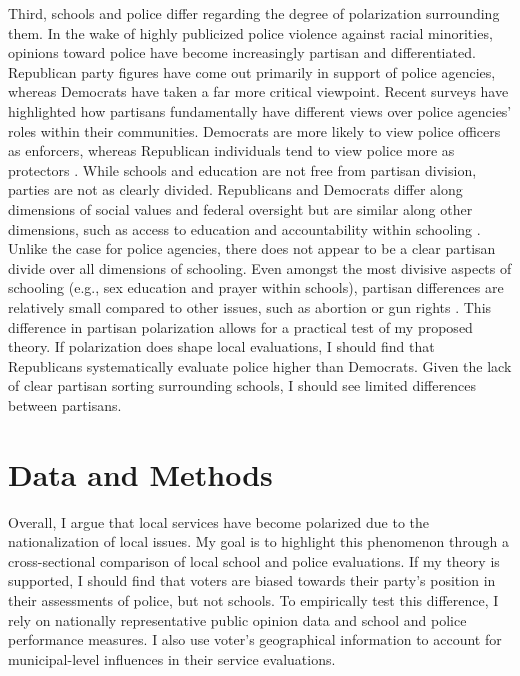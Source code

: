 Third, schools and police differ regarding the degree of polarization surrounding them. In the wake of highly publicized police violence against racial minorities, opinions toward police have become increasingly partisan and differentiated. Republican party figures have come out primarily in support of police agencies, whereas Democrats have taken a far more critical viewpoint. Recent surveys have highlighted how partisans fundamentally have different views over police agencies' roles within their communities. Democrats are more likely to view police officers as enforcers, whereas Republican individuals tend to view police more as protectors \citep{pewresearchcenterPartisansDifferWidley2017}. While schools and education are not free from partisan division, parties are not as clearly divided. Republicans and Democrats differ along dimensions of social values and federal oversight but are similar along other dimensions, such as access to education and accountability within schooling \citep{jensenCityLimitsPartisan2021}. Unlike the case for police agencies, there does not appear to be a clear partisan divide over all dimensions of schooling. Even amongst the most divisive aspects of schooling (e.g., sex education and prayer within schools), partisan differences are relatively small compared to other issues, such as abortion or gun rights \citep{shapiroAmericanPublicOpinion2021}. This difference in partisan polarization allows for a practical test of my proposed theory. If polarization does shape local evaluations, I should find that Republicans systematically evaluate police higher than Democrats. Given the lack of clear partisan sorting surrounding schools, I should see limited differences between partisans.


\section{Data and Methods}
Overall, I argue that local services have become polarized due to the nationalization of local issues. My goal is to highlight this phenomenon through a cross-sectional comparison of local school and police evaluations. If my theory is supported, I should find that voters are biased towards their party's position in their assessments of police, but not schools. To empirically test this difference, I rely on nationally representative public opinion data and school and police performance measures. I also use voter's geographical information to account for municipal-level influences in their service evaluations. 

